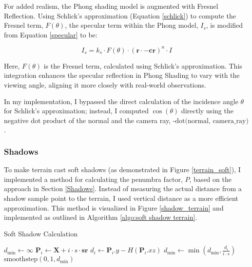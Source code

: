 For added realism, the Phong shading model is augmented with Fresnel Reflection. Using Schlick's approximation (Equation \ref{schlick}) to compute the Fresnel term, $F(\theta)$, the specular term within the Phong model, $I_s$, is modified from Equation \ref{specular} to be:

\begin{equation}
I_{s} = k_s \cdot F(\theta) \cdot (\mathbf{r} \cdot \mathbf{-cr})^n \cdot I
\end{equation}

Here, $F(\theta)$ is the Fresnel term, calculated using Schlick's approximation. This integration enhances the specular reflection in Phong Shading to vary with the viewing angle, aligning it more closely with real-world observations.

In my implementation, I bypassed the direct calculation of the incidence angle $\theta$ for Schlick's approximation; instead, I computed $\cos(\theta)$ directly using the negative dot product of the normal and the camera ray, $\text{-dot(normal, camera\_ray)}$.

\subsubsection{Shadows}
\label{Terrain Shadows}

To make terrain cast soft shadows (as demonstrated in Figure \ref{terrain_soft}), I implemented a method for calculating the penumbra factor, $P$, based on the approach in Section \ref{Shadows}. Instead of measuring the actual distance from a shadow sample point to the terrain, I used vertical distance as a more efficient approximation. This method is visualized in Figure \ref{shadow_terrain} and implemented as outlined in Algorithm \ref{algo:soft shadow terrain}.

\begin{algorithm}
\caption{Soft Shadow Calculation}
\label{algo:soft shadow terrain}
\begin{algorithmic}
    \State $d_{\text{min}} \gets \infty$
        \State $\mathbf{P}_i \gets \mathbf{X} + i \cdot s \cdot \mathbf{sr}$
        \State $d_i \gets \mathbf{P}_i.y - H(\mathbf{P}_i.xz)$
        \State $d_{\text{min}} \gets \min(d_{\text{min}}, \frac{d_i}{i \cdot s})$
    \EndFor
    \State \Return $\text{smoothstep}(0, 1, d_{\text{min}})$
\EndFunction
\end{algorithmic}
\end{algorithm}

